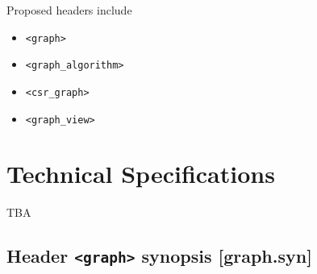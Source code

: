\documentclass[10pt,onecolumn]{article}
\newcommand{\tcode}[1]{\lstinline[breaklines=true]{#1}}
\begin{document}
Proposed headers include
\begin{itemize}
\item[]\tcode{<graph>}
\item[]\tcode{<graph_algorithm>}
\item[]\tcode{<csr_graph>}
\item[]\tcode{<graph_view>}
\end{itemize}

\section{Technical Specifications}
TBA

\subsection{Header \tcode{<graph>} synopsis [graph.syn]}
\end{document}
